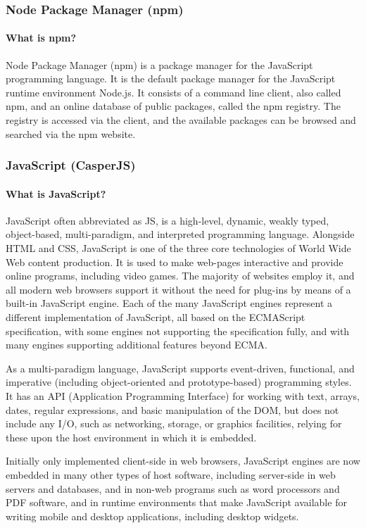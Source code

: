 \documentclass{article}
\begin{document}
\subsubsection{Node Package Manager (npm)}
\paragraph{What is npm?}
Node Package Manager (npm) is a package manager for the JavaScript programming language. It is the default package manager for the JavaScript runtime environment Node.js. It consists of a command line client, also called npm, and an online database of public packages, called the npm registry. The registry is accessed via the client, and the available packages can be browsed and searched via the npm website.
\subsubsection{JavaScript (CasperJS)}
\paragraph{What is JavaScript?}
JavaScript often abbreviated as JS, is a high-level, dynamic, weakly typed, object-based, multi-paradigm, and interpreted programming language. Alongside HTML and CSS, JavaScript is one of the three core technologies of World Wide Web content production. It is used to make web-pages interactive and provide online programs, including video games. The majority of websites employ it, and all modern web browsers support it without the need for plug-ins by means of a built-in JavaScript engine. Each of the many JavaScript engines represent a different implementation of JavaScript, all based on the ECMAScript specification, with some engines not supporting the specification fully, and with many engines supporting additional features beyond ECMA.
	
As a multi-paradigm language, JavaScript supports event-driven, functional, and imperative (including object-oriented and prototype-based) programming styles. It has an API (Application Programming Interface) for working with text, arrays, dates, regular expressions, and basic manipulation of the DOM, but does not include any I/O, such as networking, storage, or graphics facilities, relying for these upon the host environment in which it is embedded.
	
Initially only implemented client-side in web browsers, JavaScript engines are now embedded in many other types of host software, including server-side in web servers and databases, and in non-web programs such as word processors and PDF software, and in runtime environments that make JavaScript available for writing mobile and desktop applications, including desktop widgets.
	
\end{document}
